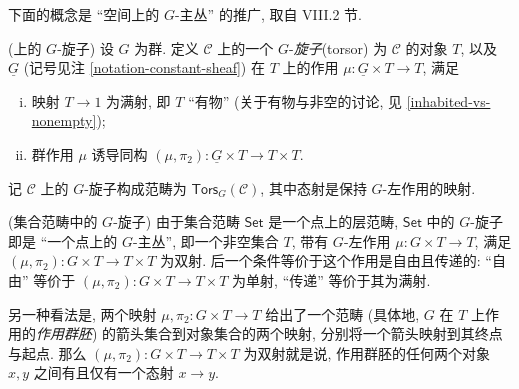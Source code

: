 
下面的概念是 ``空间上的 $G$-主丛'' 的推广, 取自 \cite{SGL} VIII.2 节.
\begin{definition}
	[label={G-torsors-over-topos}]
	{(\topos{}上的 $G$-旋子)}
	设 $G$ 为群. 定义 $\mathcal C$ 上的一个 $G$-\emph{旋子}\footnotemark (torsor) 为 $\mathcal C$ 的对象 $T$, 以及 $\underline G$ (记号见注 \ref{notation-constant-sheaf}) 在 $T$ 上的作用 $\mu\colon \underline G\times T \to T$, 满足
	\begin{enumerate}[(i)]
		\item 映射 $T\to 1$ 为满射, 即 $T$ ``有物'' (关于有物与非空的讨论, 见 \ref{inhabited-vs-nonempty});
		\item 群作用 $\mu$ 诱导同构 $(\mu,\pi_2)\colon \underline G\times T \to T\times T$.
	\end{enumerate}
	记 $\mathcal C$ 上的 $G$-旋子构成范畴为 $\mathsf{Tors}_G(\mathcal C)$, 其中态射是保持 $G$-左作用的映射.
\end{definition}

%	

\begin{example}
	{(集合范畴中的 $G$-旋子)}
	由于集合范畴 $\mathsf {Set}$ 是一个点上的层范畴,
	$\mathsf {Set}$ 中的 $G$-旋子即是 ``一个点上的 $G$-主丛'',
	即一个非空集合 $T$, 带有 $G$-左作用 $\mu\colon G\times T \to T$, 满足 $(\mu,\pi_2)\colon G\times T \to T\times T$ 为双射.
	后一个条件等价于这个作用是自由且传递的:
	``自由'' 等价于 $(\mu,\pi_2)\colon G\times T \to T\times T$ 为单射, ``传递'' 等价于其为满射.
	
	另一种看法是, 两个映射 $\mu,\pi_2\colon G\times T \to T$ 给出了一个范畴 (具体地, $G$ 在 $T$ 上作用的\emph{作用群胚}) 的箭头集合到对象集合的两个映射, 分别将一个箭头映射到其终点与起点. 那么 $(\mu,\pi_2)\colon G\times T \to T\times T$ 为双射就是说, 作用群胚的任何两个对象 $x,y$ 之间有且仅有一个态射 $x\to y$.
\end{example}

